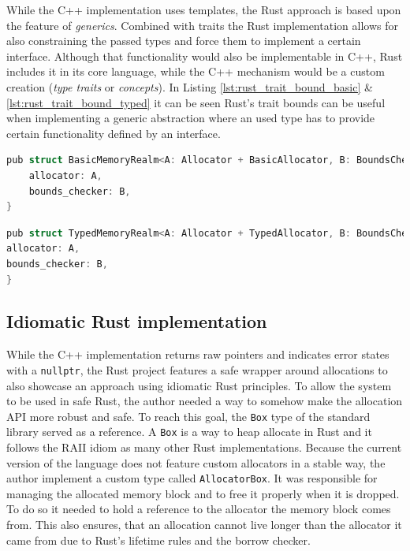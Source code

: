 While the C++ implementation uses templates, the Rust approach is based upon the feature of \textit{generics}. Combined with traits the Rust implementation allows for also constraining the passed types and force them to implement a certain interface. Although that functionality would also be implementable in C++, Rust includes it in its core language, while the C++ mechanism would be a custom creation (\textit{type traits} or \textit{concepts}). In Listing \ref{lst:rust_trait_bound_basic} \& \ref{lst:rust_trait_bound_typed} it can be seen Rust's trait bounds can be useful when implementing a generic abstraction where an used type has to provide certain functionality defined by an interface.\\

\begin{lstlisting}[caption={Rust interface of the basic memory realm allowing only basic allocators.}, label={lst:rust_trait_bound_basic}, language={C++}]
pub struct BasicMemoryRealm<A: Allocator + BasicAllocator, B: BoundsChecker + Default> {
	allocator: A,
	bounds_checker: B,
}
\end{lstlisting}

\begin{lstlisting}[caption={Rust interface of the typed memory realm.}, label={lst:rust_trait_bound_typed}, language={C++}]
pub struct TypedMemoryRealm<A: Allocator + TypedAllocator, B: BoundsChecker + Default> {
allocator: A,
bounds_checker: B,
}
\end{lstlisting}

\subsection{Idiomatic Rust implementation}

While the C++ implementation returns raw pointers and indicates error states with a \texttt{nullptr}, the Rust project features a safe wrapper around allocations to also showcase an approach using idiomatic Rust principles. To allow the system to be used in safe Rust, the author needed a way to somehow make the allocation \ac{API} more robust and safe. To reach this goal, the \texttt{Box} type of the standard library served as a reference. A \texttt{Box} is a way to heap allocate in Rust and it follows the \ac{RAII} idiom as many other Rust implementations. Because the current version of the language does not feature custom allocators in a stable way, the author implement a custom type called \texttt{AllocatorBox}. It was responsible for managing the allocated memory block and to free it properly when it is dropped. To do so it needed to hold a reference to the allocator the memory block comes from. This also ensures, that an allocation cannot live longer than the allocator it came from due to Rust's lifetime rules and the borrow checker.\\

